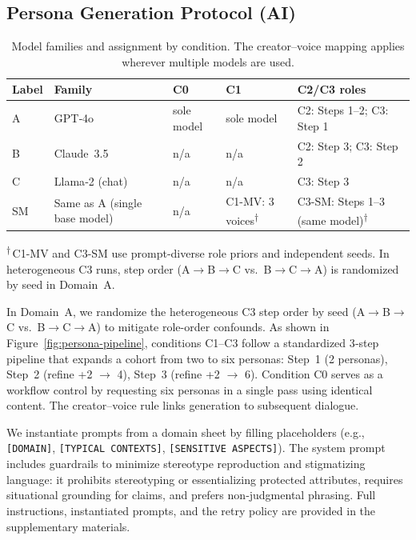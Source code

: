 \documentclass[acmsmall]{acmart}
\begin{document}
\subsection{Persona Generation Protocol (AI)}
\label{sec:persona-protocol}
\begin{table}[!ht]
  \centering
  \caption{Model families and assignment by condition. The creator–voice mapping applies wherever multiple models are used.}
  \label{tab:models}
  \small
  \begin{tabular}{@{}l l l l l@{}}
    \toprule
    \textbf{Label} & \textbf{Family} & \textbf{C0} & \textbf{C1} & \textbf{C2/C3 roles} \\
    \midrule
    A & GPT‑4o & sole model & sole model & C2: Steps 1--2; C3: Step 1 \\
    B & Claude~3.5 & n/a & n/a & C2: Step 3; \; C3: Step 2 \\
    C & Llama‑2 (chat) & n/a & n/a & C3: Step 3 \\
    \addlinespace[2pt]
    SM & Same as A (single base model) & n/a & C1-MV: 3 voices\textsuperscript{$\dagger$} & C3-SM: Steps 1--3 (same model)\textsuperscript{$\dagger$} \\
    \bottomrule
  \end{tabular}

  \vspace{0.25ex}
  {\footnotesize \textsuperscript{$\dagger$}\,C1-MV and C3-SM use prompt-diverse role priors and independent seeds. In heterogeneous C3 runs, step order (A$\rightarrow$B$\rightarrow$C vs.\ B$\rightarrow$C$\rightarrow$A) is randomized by seed in Domain~A.}
\end{table}

\noindent In Domain~A, we randomize the heterogeneous C3 step order by seed (A$\rightarrow$B$\rightarrow$C vs.\ B$\rightarrow$C$\rightarrow$A) to mitigate role-order confounds. As shown in Figure~\ref{fig:persona-pipeline}, conditions C1--C3 follow a standardized 3‑step pipeline that expands a cohort from two to six personas: Step~1 (2 personas), Step~2 (refine +2 $\rightarrow$ 4), Step~3 (refine +2 $\rightarrow$ 6). Condition C0 serves as a workflow control by requesting six personas in a single pass using identical content. The creator–voice rule links generation to subsequent dialogue.

We instantiate prompts from a domain sheet by filling placeholders (e.g., \texttt{[DOMAIN]}, \texttt{[TYPICAL CONTEXTS]}, \texttt{[SENSITIVE ASPECTS]}). The system prompt includes guardrails to minimize stereotype reproduction and stigmatizing language: it prohibits stereotyping or essentializing protected attributes, requires situational grounding for claims, and prefers non‑judgmental phrasing. Full instructions, instantiated prompts, and the retry policy are provided in the supplementary materials.
\end{document}
